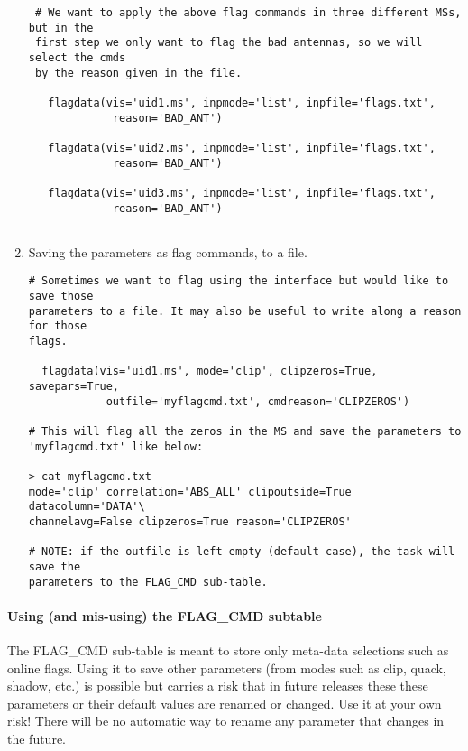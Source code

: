 \begin{enumerate}
\begin{verbatim}
 # We want to apply the above flag commands in three different MSs, but in the
 first step we only want to flag the bad antennas, so we will select the cmds
 by the reason given in the file.
 
   flagdata(vis='uid1.ms', inpmode='list', inpfile='flags.txt',
             reason='BAD_ANT')

   flagdata(vis='uid2.ms', inpmode='list', inpfile='flags.txt',
             reason='BAD_ANT')

   flagdata(vis='uid3.ms', inpmode='list', inpfile='flags.txt',
             reason='BAD_ANT')
      
\end{verbatim}

\item Saving the parameters as flag commands, to a file.

\begin{verbatim}
# Sometimes we want to flag using the interface but would like to save those
parameters to a file. It may also be useful to write along a reason for those
flags.

  flagdata(vis='uid1.ms', mode='clip', clipzeros=True, savepars=True,
            outfile='myflagcmd.txt', cmdreason='CLIPZEROS')
  
# This will flag all the zeros in the MS and save the parameters to
'myflagcmd.txt' like below:

> cat myflagcmd.txt
mode='clip' correlation='ABS_ALL' clipoutside=True datacolumn='DATA'\
channelavg=False clipzeros=True reason='CLIPZEROS'

# NOTE: if the outfile is left empty (default case), the task will save the
parameters to the FLAG_CMD sub-table.

\end{verbatim}
\end{enumerate}


\paragraph{Using (and mis-using) the FLAG_CMD subtable}
The FLAG\_CMD sub-table is meant to store only meta-data selections such as
online flags. Using it to save other parameters (from modes such as clip, quack,
shadow, etc.) is possible but carries a risk that in future releases these
these parameters or their default values are renamed or changed.
Use it at your own risk! There will be no automatic way to rename any parameter that changes in the
future.


